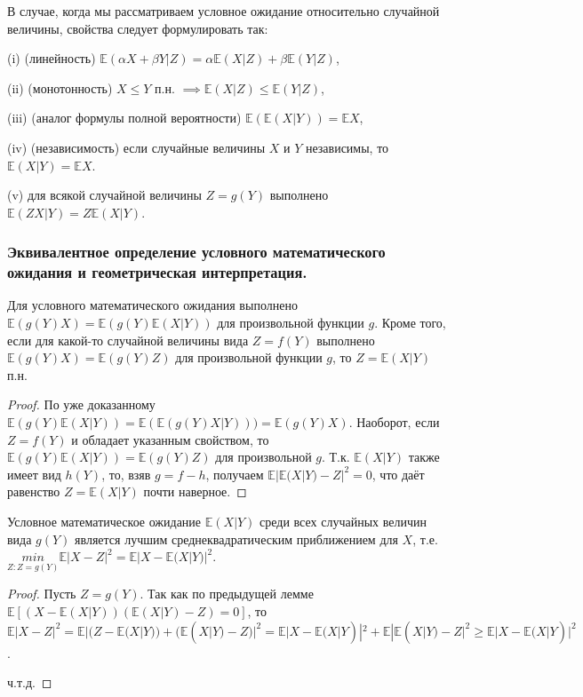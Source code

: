 \begin{theorem}
	В случае, когда мы рассматриваем условное ожидание относительно случайной величины, свойства следует формулировать так:
	
	(i) (линейность) $\mathbb{E}(\alpha X + \beta Y |Z) = \alpha\mathbb{E}(X|Z) + \beta\mathbb{E}(Y | Z)$,
	
	(ii) (монотонность) $X \leqslant Y$ п.н. $\implies \mathbb{E}(X|Z) \leqslant \mathbb{E}(Y|Z)$,
	
	(iii) (аналог формулы полной вероятности) $\mathbb{E}(\mathbb{E}(X|Y)) = \mathbb{E}X$,
	
	(iv) (независимость) если случайные величины $X$ и $Y$ независимы, то $\mathbb{E}(X|Y) = \mathbb{E}X$.
	
	(v) для всякой случайной величины $Z = g(Y)$ выполнено $\mathbb{E}(ZX|Y ) = Z\mathbb{E}(X|Y )$.
\end{theorem}

\subsubsection{Эквивалентное определение условного математического ожидания и геометрическая интерпретация.}

Для условного математического ожидания выполнено $\mathbb{E}(g(Y)X) = \mathbb{E}(g(Y)\mathbb{E}(X|Y))$ для произвольной функции $g$. Кроме того, если для какой-то случайной величины вида $Z = f(Y)$ выполнено $\mathbb{E}(g(Y)X) = \mathbb{E}(g(Y)Z)$ для произвольной функции $g$, то $Z = \mathbb{E}(X|Y)$ п.н.

\begin{proof} По уже доказанному $\mathbb{E}(g(Y)\mathbb{E}(X|Y))= \mathbb{E}(\mathbb{E}(g(Y)X|Y)))=\mathbb{E}(g(Y)X)$. Наоборот, если $Z = f(Y)$ и обладает указанным свойством, то $\mathbb{E}(g(Y)\mathbb{E}(X|Y))=\mathbb{E}(g(Y)Z)$ для произвольной $g$. Т.к. $\mathbb{E}(X|Y)$ также имеет вид $h(Y)$, то, взяв $g = f - h$, получаем $\mathbb{E}|\mathbb{E}(X|Y)-Z|^2 = 0$, что даёт равенство $Z = \mathbb{E}(X|Y)$ почти наверное.
\end{proof}

\begin{proposal}
	Условное математическое ожидание $\mathbb{E}(X|Y)$ среди всех случайных	величин вида $g(Y)$ является лучшим среднеквадратическим приближением для $X$, т.е. $\underset{Z:Z=g(Y )}{min}	\mathbb{E}|X-Z|^2 = \mathbb{E}|X-\mathbb{E}(X|Y)|^2$.
\end{proposal}

\begin{proof}
	Пусть $Z = g(Y)$. Так как по предыдущей лемме $\mathbb{E}[(X - \mathbb{E}(X|Y))(\mathbb{E}(X|Y) - Z) = 0]$, то $\mathbb{E}|X - Z|^2 = \mathbb{E}|(Z-\mathbb{E}(X|Y)) + (\mathbb{E}(X|Y)-Z)|^2 = \mathbb{E}|X-\mathbb{E}(X|Y)|^2 + \mathbb{E}|\mathbb{E}(X|Y)-Z|^2 \geqslant \mathbb{E}|X - \mathbb{E}(X|Y)|^2$.
	
	ч.т.д.
\end{proof}

